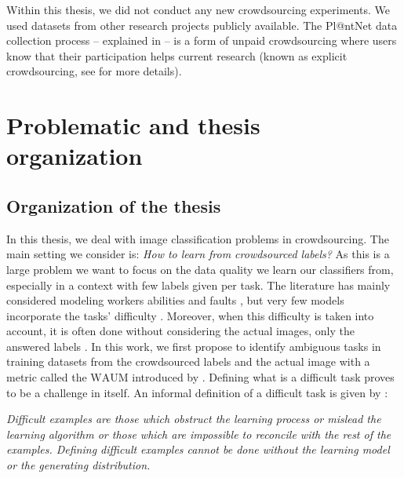Within this thesis, we did not conduct any new crowdsourcing experiments.
We used datasets from other research projects publicly available.
The Pl@ntNet data collection process -- explained in  -- is a form of unpaid crowdsourcing where users know that their participation helps current research (known as explicit crowdsourcing, see  for more details).

\section{Problematic and thesis organization}

\subsection{Organization of the thesis}

In this thesis, we deal with image classification problems in crowdsourcing.
The main setting we consider is: \emph{How to learn from crowdsourced labels?}
As this is a large problem we want to focus on the data quality we learn our classifiers from, especially in a context with few labels given per task.
The literature has mainly considered modeling workers abilities and faults \citep{dawid_maximum_1979, sinha2018fast,rodrigues2018deep,raykar_ranking_2011}, but very few models incorporate the tasks' difficulty \citep{whitehill_whose_2009, chu2021learning}.
Moreover, when this difficulty is taken into account, it is often done without considering the actual images, only the answered labels \citep{whitehill_whose_2009}.
In this work, we first propose to identify ambiguous tasks in training datasets from the crowdsourced labels and the actual image with a metric called the $\mathrm{WAUM}$ introduced by \citet{lefort2022improve}.
Defining what is a difficult task proves to be a challenge in itself.
An informal definition of a difficult task is given by \citet{angelova2004data}:
\begin{center}
\begin{minipage}{.75\textwidth}
\emph{
Difficult examples are those which obstruct the learning process or mislead the learning algorithm or those which are impossible to reconcile with the rest of the examples. Defining difficult examples cannot be done without the learning model or the generating distribution.
}
\end{minipage}
\end{center}

